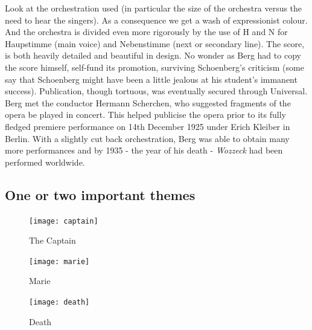 Look at the orchestration used (in particular the size of the orchestra versus the need to hear the singers). As a consequence we get a wash of expressionist colour. And the orchestra is divided even more rigorously by the use of H and N for Haupstimme (main voice) and Nebenstimme (next or secondary line). The score, is both heavily detailed and beautiful in design. No wonder as Berg had to copy the score himself, self-fund its promotion, surviving Schoenberg's criticism (some say that Schoenberg might have been a little jealous at his student's immanent success). Publication, though tortuous, was eventually secured through Universal. Berg met the conductor Hermann Scherchen, who suggested fragments of the opera be played in concert. This helped publicise the opera prior to its fully fledged premiere performance on 14th December 1925 under Erich Kleiber in Berlin. With a slightly cut back orchestration, Berg was able to obtain many more performances and by 1935 - the year of his death - \textit{Wozzeck} had been performed worldwide.  

\subsection{One or two important themes}

\begin{figure}[H]
\centering
\texttt{[image: captain]}\caption{The Captain}
\label{fig:captain}
\end{figure}


\begin{figure}[H]
\centering
\texttt{[image: marie]}\caption{Marie}
\label{fig:marie}
\end{figure}


\begin{figure}[H]
\centering
\texttt{[image: death]}\caption{Death}
\label{fig:death}
\end{figure}



